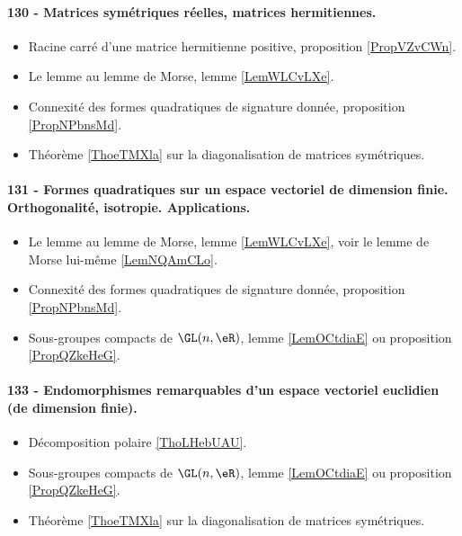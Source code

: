 \paragraph{130 - Matrices symétriques réelles, matrices hermitiennes.}
\begin{itemize}
    \item Racine carré d'une matrice hermitienne positive, proposition \ref{PropVZvCWn}.
    \item Le lemme au lemme de Morse, lemme \ref{LemWLCvLXe}.
    \item Connexité des formes quadratiques de signature donnée, proposition \ref{PropNPbnsMd}.
    \item Théorème \ref{ThoeTMXla} sur la diagonalisation de matrices symétriques.
\end{itemize}
\paragraph{131 - Formes quadratiques sur un espace vectoriel de dimension finie. Orthogonalité, isotropie. Applications.}
\begin{itemize}
    \item Le lemme au lemme de Morse, lemme \ref{LemWLCvLXe}, voir le lemme de Morse lui-même \ref{LemNQAmCLo}.
    \item Connexité des formes quadratiques de signature donnée, proposition \ref{PropNPbnsMd}.
    \item Sous-groupes compacts de \( \GL(n,\eR)\), lemme \ref{LemOCtdiaE} ou proposition \ref{PropQZkeHeG}.
\end{itemize}

\paragraph{133 - Endomorphismes remarquables d’un espace vectoriel euclidien (de dimension finie).}
\begin{itemize}
    \item Décomposition polaire \ref{ThoLHebUAU}.
    \item Sous-groupes compacts de \( \GL(n,\eR)\), lemme \ref{LemOCtdiaE} ou proposition \ref{PropQZkeHeG}.
    \item Théorème \ref{ThoeTMXla} sur la diagonalisation de matrices symétriques.
\end{itemize}
